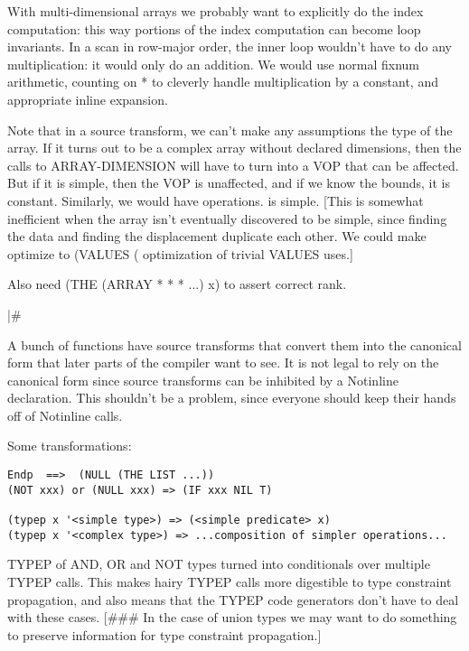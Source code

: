 With multi-dimensional arrays we probably want to explicitly do the index
computation: this way portions of the index computation can become loop
invariants.  In a scan in row-major order, the inner loop wouldn't have to do
any multiplication: it would only do an addition.  We would use normal
fixnum arithmetic, counting on * to cleverly handle multiplication by a
constant, and appropriate inline expansion.

Note that in a source transform, we can't make any assumptions the type of the
array.  If it turns out to be a complex array without declared dimensions, then
the calls to ARRAY-DIMENSION will have to turn into a VOP that can be affected.
But if it is simple, then the VOP is unaffected, and if we know the bounds, it
is constant.  Similarly, we would have %
operations.  %
is simple.  [This is somewhat inefficient when the array isn't eventually
discovered to be simple, since finding the data and finding the displacement
duplicate each other.  We could make %
optimize to (VALUES (%
optimization of trivial VALUES uses.]

Also need (THE (ARRAY * * * ...) x) to assert correct rank.

|\#

A bunch of functions have source transforms that convert them into the
canonical form that later parts of the compiler want to see.  It is not legal
to rely on the canonical form since source transforms can be inhibited by a
Notinline declaration.  This shouldn't be a problem, since everyone should keep
their hands off of Notinline calls.

Some transformations:
\begin{verbatim}
Endp  ==>  (NULL (THE LIST ...))
(NOT xxx) or (NULL xxx) => (IF xxx NIL T)

(typep x '<simple type>) => (<simple predicate> x)
(typep x '<complex type>) => ...composition of simpler operations...
\end{verbatim}

TYPEP of AND, OR and NOT types turned into conditionals over multiple TYPEP
calls.  This makes hairy TYPEP calls more digestible to type constraint
propagation, and also means that the TYPEP code generators don't have to deal
with these cases.  [\#\#\# In the case of union types we may want to do something
to preserve information for type constraint propagation.]


